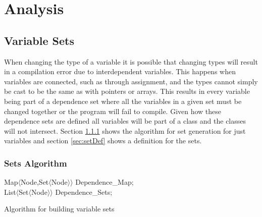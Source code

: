 \documentclass[natbib]{article}
\begin{document}
\section{Analysis} \label{analysis}
\subsection{Variable Sets}
When changing the type of a variable it is possible that changing types will result in a 
compilation error due to interdependent variables. This happens when variables are connected, 
such as through assignment, and the types cannot simply be cast to be the same as with pointers 
or arrays. This results in every variable being part of a dependence set where all the variables 
in a given set must be changed together or the program will fail to compile. Given how these 
dependence sets are defined all variables will be part of a class and the classes will not intersect. 
Section \ref{sec:setAlg} shows the algorithm for set generation for just variables and 
section \ref{sec:setDef} shows a definition for the sets.

\subsubsection{Sets Algorithm} \label{sec:setAlg}
\begin{algorithm}[H]
\label{variableSetAlgo}
\SetAlgoLined
{}
Map$\langle$Node,Set$\langle$Node$\rangle\rangle$ Dependence\_Map;\\
List$\langle$Set$\langle$Node$\rangle\rangle$ Dependence\_Sets;\\
 \caption{Algorithm for building variable sets}
\end{algorithm}
\end{document}
